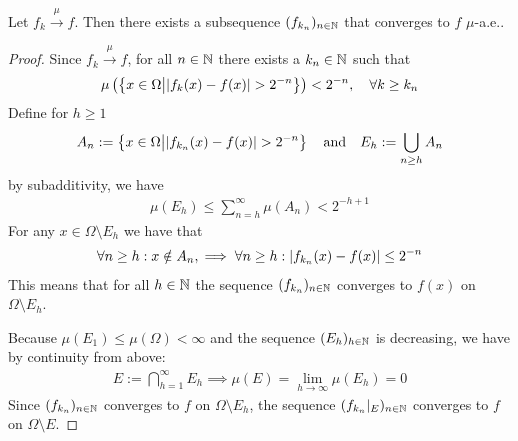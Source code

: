 \begin{thm}[]\label{thm:subsequence-muae}
  Let $f_k \stackrel{\mu}{\to} f$. Then there exists a subsequence $(f_{k_n})_{n \in \mathbb{N}}$ that converges to $f$ $\mu$-a.e..
\end{thm}
\begin{proof}
  Since $f_k \stackrel{\mu}{\to} f$, for all $n \in \mathbb{N}$ there exists a $k_n \in \mathbb{N}$ such that
  \begin{align*}
    \mu\left(
      \left\{x \in \Omega \big\vert \vert f_k(x) - f(x)\vert> 2^{-n}\right\} 
    \right) < 2^{-n}
    , \quad
    \forall k \geq k_n 
  \end{align*}
  Define for $h \geq 1$
  \begin{align*}
    A_n := \left\{x \in \Omega \big\vert \vert f_{k_n}(x) - f(x)\vert > 2^{-n}\right\}
    \quad \text{and} \quad E_h := \bigcup_{n \geq h}A_n
  \end{align*}
  by subadditivity, we have
  \begin{align*}
    \mu(E_h) \leq \sum_{n=h}^{\infty}\mu(A_n) < 2^{-h + 1}
  \end{align*}
  For any $x \in \Omega \setminus E_h$ we have that 
  \begin{align*}
    \forall n \geq h:
    x \notin A_n, \implies \forall n \geq h: \vert f_{k_n}(x) -f(x)\vert \leq 2^{-n}
  \end{align*}
  This means that for all $h \in \mathbb{N}$ the sequence $(f_{k_n})_{n \in \mathbb{N}}$ converges to $f(x)$ on $\Omega \setminus E_h$.

  Because $\mu(E_1) \leq \mu(\Omega) < \infty$ and the sequence $(E_h)_{h \in \mathbb{N}}$ is decreasing, we have by continuity from above:
  \begin{align*}
    E := \bigcap_{h=1}^{\infty}E_h
    \implies
    \mu(E) = \lim_{h \to \infty}\mu(E_h) = 0
  \end{align*}
  Since $(f_{k_n})_{n \in \mathbb{N}}$ converges to $f$ on $\Omega \setminus E_h$, the sequence $(f_{k_n}|_{E})_{n \in \mathbb{N}}$ converges to $f$ on $\Omega \setminus E$.

\end{proof}
